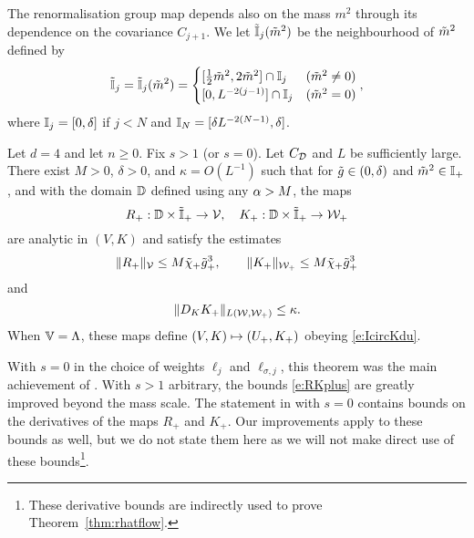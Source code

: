 The renormalisation group map depends also on the mass $m^2$ through its
dependence on the covariance $C_{j+1}$.
We let $\tilde{\mathbb{I}}_j(\tilde{m}^2)$ be the neighbourhood of $\tilde{m}^2$ defined by
\begin{equation}
\lbeq{Itilint}
    \Igen_j = \Igen_j(\mgen^2) =
    \begin{cases}
    [\frac 12 \mgen^2, 2 \mgen^2] \cap \Iint_j & (\mgen^2 \neq 0)
    \\
    [0,L^{-2(j-1)}] \cap \Iint_j & (\mgen^2 =0)
    \end{cases},
\end{equation}
where $\mathbb{I}_j = [0, \delta]$ if $j < N$ and $\mathbb{I}_N = [\delta L^{-2 (N - 1)}, \delta]$.

\begin{theorem}
\label{thm:step-mr-fv}
Let $d = 4$ and let $n \ge 0$. Fix $s > 1$ (or $s = 0$). Let $C_{\mathcal{D}}$ and $L$
be sufficiently large. There exist $M>0$, $\delta >0$,
and $\kappa = O(L^{-1})$											%
such that for $\tilde{g} \in (0,\delta)$
and $\tilde{m}^2 \in \mathbb{I}_+$,											%
and with the domain $\mathbb{D}$ defined using any $\alpha> M$, the maps
\begin{equation}
\label{e:RKplusmaps}
R_+:\domRG \times \Igen_+ %
	\to \Vcal,
		\quad
K_+:\domRG \times \Igen_+ %
	\to \Wcal_{+}%
\end{equation}
are analytic in $(V, K)$											%
and satisfy the estimates
\begin{equation}
\label{e:RKplus}
\|R_+\|_{\mathcal{V}}
\le
M\tilde{\chi}_+\tilde{g}_+^{3}
, \qquad
\|K_+\|_{\mathcal{W}_+}
\le
M\tilde{\chi}_+ \tilde{g}_+^{3}
\end{equation}
and
\begin{equation}
\label{e:DKkappa}
\|D_K K_+\|_{L(\mathcal{W},\mathcal{W}_+)} \le \kappa.
\end{equation}
When $\mathbb{V} = \Lambda$, these maps define $(V,K)\mapsto (U_+,K_+)$
obeying \eqref{e:IcircKdu}.
\end{theorem}

With $s = 0$ in the choice of weights $\ell_j$ and $\ell_{\sigma,j}$,
this theorem was the main achievement of \cite{BS-rg-step}. With $s > 1$
arbitrary, the bounds \eqref{e:RKplus} are greatly improved beyond the
mass scale. The statement in \cite{BS-rg-step} with $s = 0$ contains
bounds on the derivatives of the maps $R_+$ and $K_+$. Our improvements
apply to these bounds as well, but we do not state them here as we will
not make direct use of these bounds\footnote{These derivative bounds are
indirectly used to prove Theorem~\ref{thm:rhatflow}.}.


